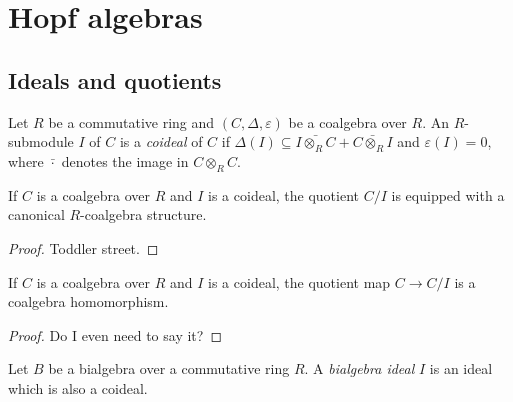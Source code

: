 \section{Hopf algebras}


\subsection{Ideals and quotients}


\begin{definition}[Coideal]
  \label{0-coideal}
  \uses{}

  Let $R$ be a commutative ring and $(C,\Delta,\varepsilon)$ be a coalgebra over $R$.
  An $R$-submodule $I$ of $C$ is a \emph{coideal} of $C$ if
  $\Delta(I) \subseteq \bar{I \otimes_R C} + \bar{C \otimes_R I}$ and $\varepsilon(I)=0$,
  where $\bar{\cdot}$ denotes the image in $C \otimes_R C$.
\end{definition}


\begin{proposition}
  \label{0-coquot}

  If $C$ is a coalgebra over $R$ and $I$ is a coideal,
  the quotient $C /I$ is equipped with a canonical $R$-coalgebra structure.
\end{proposition}
\begin{proof}
  \uses{}

  Toddler street.
\end{proof}


\begin{proposition}
  \label{0-coquot-hom}

  If $C$ is a coalgebra over $R$ and $I$ is a coideal,
  the quotient map $C \to C / I$ is a coalgebra homomorphism.
\end{proposition}
\begin{proof}
  \uses{}

  Do I even need to say it?
\end{proof}


\begin{definition}
  \label{0-biideal}

  Let $B$ be a bialgebra over a commutative ring $R$.
  A \emph{bialgebra ideal} $I$ is an ideal which is also a coideal.
\end{definition}


